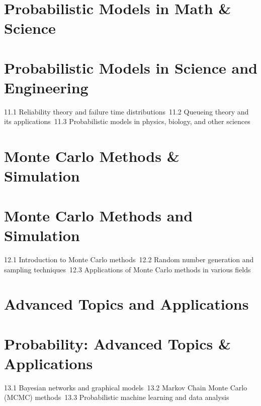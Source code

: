 \section{Probabilistic Models in Math \& Science}
\section{Probabilistic Models in Science and Engineering}
11.1 Reliability theory and failure time distributions\
11.2 Queueing theory and its applications\
11.3 Probabilistic models in physics, biology, and other sciences\
\section{Monte Carlo Methods \& Simulation}
\section{Monte Carlo Methods and Simulation}
12.1 Introduction to Monte Carlo methods\
12.2 Random number generation and sampling techniques\
12.3 Applications of Monte Carlo methods in various fields\
\section{Advanced Topics and Applications}
\section{Probability: Advanced Topics \& Applications}
13.1 Bayesian networks and graphical models\
13.2 Markov Chain Monte Carlo (MCMC) methods\
13.3 Probabilistic machine learning and data analysis\

